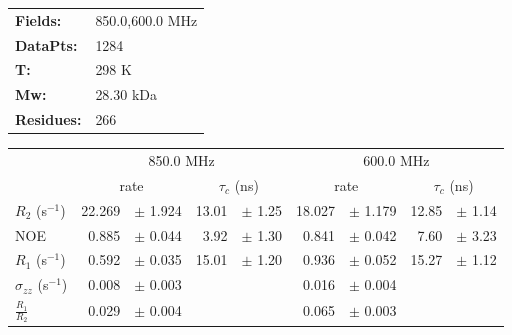 \documentclass[showkeys,aps,prb,prepreint,amssymb, amsmath,nobibnotes]{article}
\begin{document}
\begin{tabular}{ll}
\textbf{Fields:} &  850.0,600.0 MHz\\
\textbf{DataPts:} &  1284\\
 \textbf{T:} & 298 K\\
\textbf{Mw:} & 28.30 kDa\\
\textbf{Residues: } &   266\\
\end{tabular}

\begin{small}
\noindent \begin{tabular}{l|rlrl|rlrl}
& \multicolumn{4}{c}{850.0 MHz}& \multicolumn{4}{c}{600.0 MHz}\\
&  \multicolumn{2}{c}{rate} & \multicolumn{2}{c}{$\tau_c$ (ns)}   &  \multicolumn{2}{c}{rate} & \multicolumn{2}{c}{$\tau_c$ (ns)}   \\
\hline$R_2$  (s$^{-1}$)  &  22.269 & $\pm$ 1.924   &  13.01 & $\pm$ 1.25 &  18.027 & $\pm$ 1.179   &  12.85 & $\pm$ 1.14 \\
NOE  &  0.885 & $\pm$ 0.044   &  3.92 & $\pm$ 1.30 &  0.841 & $\pm$ 0.042   &  7.60 & $\pm$ 3.23 \\
$R_1$ (s$^{-1}$)  &  0.592 & $\pm$ 0.035   &  15.01 & $\pm$ 1.20 &  0.936 & $\pm$ 0.052   &  15.27 & $\pm$ 1.12 \\
$\sigma_{zz}$  (s$^{-1}$)  &  0.008 & $\pm$ 0.003   & & &  0.016 & $\pm$ 0.004   & & \\
$\frac{R_1}{R_2}$  &  0.029 & $\pm$ 0.004   & & &  0.065 & $\pm$ 0.003   & & \\
\end{tabular}
\end{small}
\end{document}
